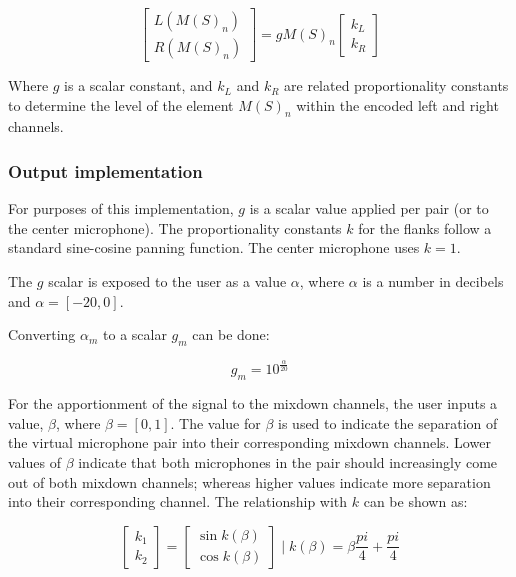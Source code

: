 \begin{equation}\label{output}
\begin{bmatrix} L(M(S)_n) \\ R(M(S)_n) \end{bmatrix} = gM(S)_n \begin{bmatrix} k_L \\ k_R \end{bmatrix}
\end{equation}

Where $g$ is a scalar constant, and $k_L$ and $k_R$ are related proportionality constants to determine the level of the element $M(S)_n$ within the encoded left and right channels. 

\subsubsection{Output implementation}

For purposes of this implementation, $g$ is a scalar value applied per pair (or to the center microphone). The proportionality constants $k$ for the flanks follow a standard sine-cosine panning function. The center microphone uses $k = 1$.

The $g$ scalar is exposed to the user as a value $\alpha$, where $\alpha$ is a number in decibels and $\alpha = [-20,0]$.

Converting $\alpha_m$ to a scalar $g_m$ can be done:

\begin{equation}\label{dbscalarconvert}
g_m = 10^{\frac{\alpha}{20}}
\end{equation}

For the apportionment of the signal to the mixdown channels, the user inputs a value, $\beta$, where $\beta = [0, 1]$. The value for $\beta$ is used to indicate the separation of the virtual microphone pair into their corresponding mixdown channels. Lower values of $\beta$ indicate that both microphones in the pair should increasingly come out of both mixdown channels; whereas higher values indicate more separation into their corresponding channel. The relationship with $k$ can be shown as:

\begin{equation}\label{pairsPanning}
\begin{bmatrix} k_1 \\ k_2 \end{bmatrix} = \begin{bmatrix} \sin{k(\beta)} \\ \cos{k(\beta)} \end{bmatrix} \; | \; k(\beta) = \beta\frac{pi}{4} + \frac{pi}{4}
\end{equation}


